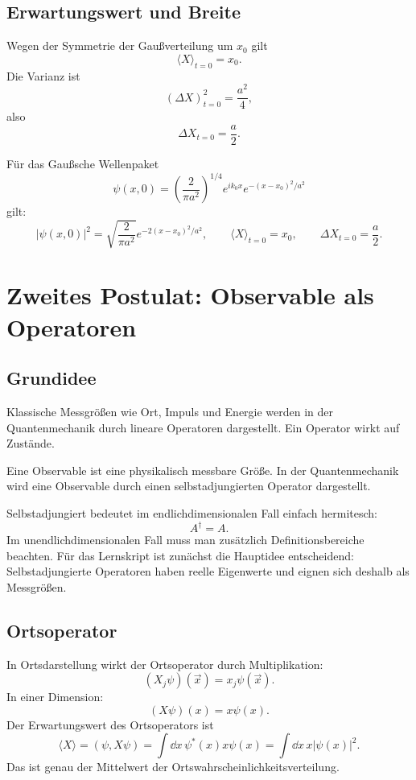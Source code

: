 \subsection{Erwartungswert und Breite}

Wegen der Symmetrie der Gaußverteilung um $x_0$ gilt
\[
    \langle X\rangle_{t=0}=x_0.
\]
Die Varianz ist
\[
    (\Delta X)^2_{t=0}=\frac{a^2}{4},
\]
also
\[
    \Delta X_{t=0}=\frac{a}{2}.
\]

\begin{answerbox}
Für das Gaußsche Wellenpaket
\[
    \psi(x,0)
    =\left(\frac{2}{\pi a^2}\right)^{1/4}e^{ik_0x}e^{-(x-x_0)^2/a^2}
\]
gilt:
\[
    |\psi(x,0)|^2
    =\sqrt{\frac{2}{\pi a^2}}e^{-2(x-x_0)^2/a^2},
    \qquad
    \langle X\rangle_{t=0}=x_0,
    \qquad
    \Delta X_{t=0}=\frac{a}{2}.
\]
\end{answerbox}

\section{Zweites Postulat: Observable als Operatoren}

\subsection{Grundidee}

Klassische Messgrößen wie Ort, Impuls und Energie werden in der Quantenmechanik durch lineare Operatoren dargestellt. Ein Operator wirkt auf Zustände.

\begin{definitionbox}
Eine Observable ist eine physikalisch messbare Größe. In der Quantenmechanik wird eine Observable durch einen selbstadjungierten Operator dargestellt.
\end{definitionbox}

Selbstadjungiert bedeutet im endlichdimensionalen Fall einfach hermitesch:
\[
    A^\dagger=A.
\]
Im unendlichdimensionalen Fall muss man zusätzlich Definitionsbereiche beachten. Für das Lernskript ist zunächst die Hauptidee entscheidend: Selbstadjungierte Operatoren haben reelle Eigenwerte und eignen sich deshalb als Messgrößen.

\subsection{Ortsoperator}

In Ortsdarstellung wirkt der Ortsoperator durch Multiplikation:
\[
    (X_j\psi)(\vec{x})=x_j\psi(\vec{x}).
\]
In einer Dimension:
\[
    (X\psi)(x)=x\psi(x).
\]
Der Erwartungswert des Ortsoperators ist
\[
    \langle X\rangle=(\psi,X\psi)
    =\int\dd x\,\psi^*(x)x\psi(x)
    =\int\dd x\,x|\psi(x)|^2.
\]
Das ist genau der Mittelwert der Ortswahrscheinlichkeitsverteilung.

